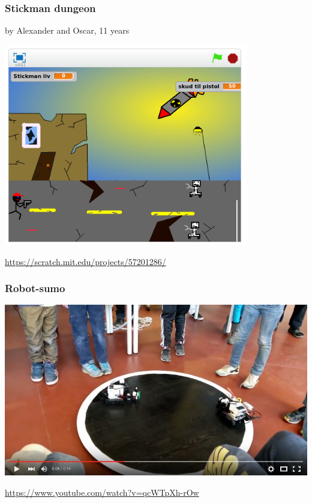 \documentclass{beamer}
\begin{document}
\begin{frame}
  \frametitle{Stickman dungeon}
  by Alexander and Oscar, 11 years

  \centerline{\includegraphics[width=0.8\textwidth]{imagery/stickman-dungeon}}

  \url{https://scratch.mit.edu/projects/57201286/}
\end{frame}

\begin{frame}
  \frametitle{Robot-sumo}
  \includegraphics[width=\textwidth]{imagery/robotsumo}
  
  \url{https://www.youtube.com/watch?v=qcWTpXh-rOw}
\end{frame}
\end{document}
